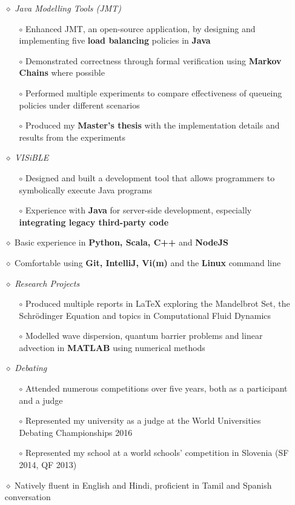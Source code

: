 \documentclass[a4paper]{article}
\begin{document}
\begin{itemize}
\item[$\diamond$] \textit{Java Modelling Tools (JMT)}
\begin{itemize}
\item[$\circ$] Enhanced JMT, an open-source application, by designing and implementing five \textbf{load balancing} policies in \textbf{Java}
\item[$\circ$] Demonstrated correctness through formal verification using \textbf{Markov Chains} where possible
\item[$\circ$] Performed multiple experiments to compare effectiveness of queueing policies under different scenarios
\item[$\circ$] Produced my \textbf{Master's thesis} with the implementation details and results from the experiments
\end{itemize}

\item[$\diamond$] \textit{VISiBLE}
\begin{itemize}
\item[$\circ$] Designed and built a development tool that allows programmers to symbolically execute Java programs
\item[$\circ$] Experience with \textbf{Java} for server-side development, especially \textbf{integrating legacy third-party code}
\end{itemize}

\item[$\diamond$] Basic experience in \textbf{Python, Scala, C++} and \textbf{NodeJS}

\item[$\diamond$] Comfortable using \textbf{Git, IntelliJ, Vi(m)} and the \textbf{Linux} command line

\item[$\diamond$] \textit{Research Projects}
\begin{itemize}
\item[$\circ$] Produced multiple reports in {\LaTeX} exploring the Mandelbrot Set, the Schr\"odinger Equation and topics in Computational Fluid Dynamics
\item[$\circ$] Modelled wave dispersion, quantum barrier problems and linear advection in \textbf{MATLAB} using numerical methods
\end{itemize}

\item[$\diamond$] \textit{Debating}
\begin{itemize}
\item[$\circ$] Attended numerous competitions over five years, both as a participant and a judge
\item[$\circ$] Represented my university as a judge at the World Universities Debating Championships 2016
\item[$\circ$] Represented my school at a world schools' competition in Slovenia (SF 2014, QF 2013)
\end{itemize}

\item[$\diamond$] Natively fluent in English and Hindi, proficient in Tamil and Spanish conversation

\end{itemize}
\end{document}
